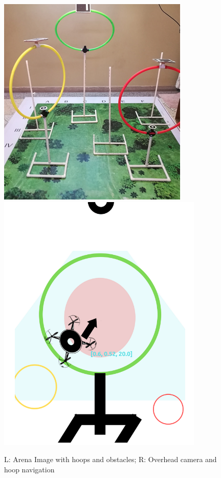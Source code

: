 \begin{figure}[H]
    \includegraphics[scale=0.9]{SummerInterReport/project/Images-Major/arena.png}
    \includegraphics[scale=0.9]{SummerInterReport/project/Images-Major/eyflow.png}
    
    \caption{L: Arena Image with hoops and obstacles; R: Overhead camera and hoop navigation}
    \label{fig:arena}
\end{figure}

